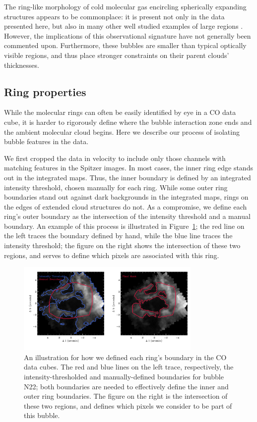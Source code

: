 The ring-like morphology of cold molecular gas encircling spherically
expanding structures appears to be commonplace: it is present not only
in the data presented here, but also in many other well studied
examples of large \hii regions \citep{Williams95, Koenig08, Zavagno06, Deharveng09}.
However, the implications of this
observational signature have not generally been commented
upon. Furthermore, these bubbles are smaller than typical optically visible \hii regions,
and thus place stronger constraints on their parent clouds' thicknesses.



\subsection {Ring properties}
\label{sec:RingProp}

While the molecular rings can often be easily identified by eye in a
CO data cube, it is harder to rigorously define where the bubble interaction zone
ends and the ambient molecular cloud begins. Here we describe our
process of isolating bubble features in the data.

We first cropped the data in velocity to include only those channels
with matching features in the Spitzer images. In most cases, the inner
ring edge stands out in the integrated maps. Thus, the inner boundary
is defined by an integrated intensity threshold, chosen manually for
each ring. While some outer ring boundaries stand out against dark
backgrounds in the integrated maps, rings on the edges of extended
cloud structures do not. As a compromise, we define each ring's outer boundary as the intersection of
the intensity threshold and a manual boundary. An example of this process is illustrated in
Figure~\ref{fig:thresh}; the red line on the left traces the boundary
defined by hand, while the blue line traces the intensity threshold;
the figure on the right shows the intersection of these two regions,
and serves to define which pixels are associated with this ring.


\begin{figure}
\includegraphics[width=3.5in, angle=0]{thresh}
\caption{An illustration for how we defined each ring's boundary in the CO data cubes.
The red and blue lines on the left trace, respectively, the intensity-thresholded and manually-defined boundaries for bubble N22;
both boundaries are needed to effectively define the inner and outer ring boundaries.
The figure on the right is the intersection of these two regions, and defines which pixels we consider to be part of this bubble.}
\label{fig:thresh}
\end{figure}


